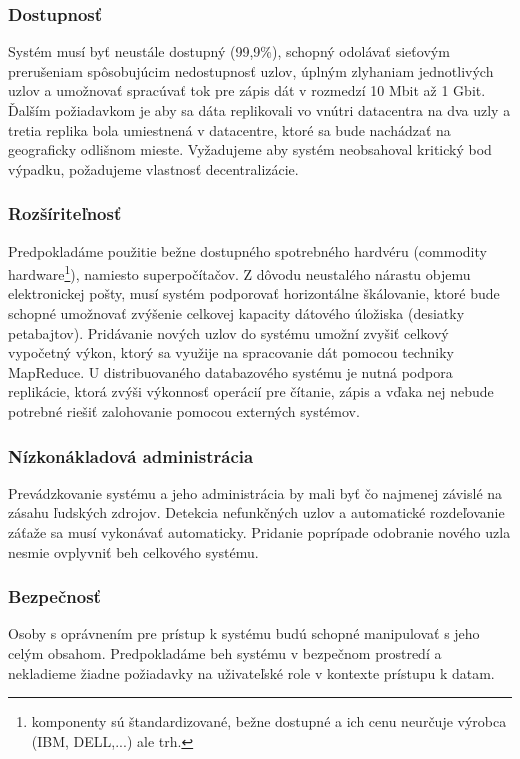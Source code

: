 \documentclass[11pt,twoside,a4paper]{book}
\begin{document}
\subsubsection*{Dostupnosť}
Systém musí byť neustále dostupný (99,9\%), schopný odolávať sieťovým prerušeniam spôsobujúcim nedostupnosť uzlov, úplným zlyhaniam jednotlivých uzlov a umožnovať spracúvať tok pre zápis dát v rozmedzí 10 Mbit až 1 Gbit. Ďalším požiadavkom je aby sa dáta replikovali vo vnútri datacentra na dva uzly a tretia replika bola umiestnená v datacentre, ktoré sa bude nachádzať na geograficky odlišnom mieste. Vyžadujeme aby systém neobsahoval kritický bod výpadku, požadujeme vlastnosť decentralizácie.

\subsubsection*{Rozšíriteľnosť}
Predpokladáme použitie bežne dostupného spotrebného hardvéru (commodity hardware\footnote{komponenty sú štandardizované, bežne dostupné a ich cenu neurčuje výrobca (IBM, DELL,...) ale trh.}), namiesto superpočítačov. Z dôvodu neustalého nárastu objemu elektronickej pošty, musí systém podporovať horizontálne škálovanie, ktoré bude schopné umožnovať zvýšenie celkovej kapacity dátového úložiska (desiatky petabajtov). Pridávanie nových uzlov do systému umožní zvyšiť celkový vypočetný výkon, ktorý sa využije na spracovanie dát pomocou techniky MapReduce. U distribuovaného databazového systému je nutná podpora replikácie, ktorá zvýši výkonnosť operácií pre čítanie, zápis a vďaka nej nebude potrebné riešiť zalohovanie pomocou externých systémov.

\subsubsection*{Nízkonákladová administrácia}
Prevádzkovanie systému a jeho administrácia by mali byť čo najmenej závislé na zásahu ľudských zdrojov. Detekcia nefunkčných uzlov a automatické rozdeľovanie záťaže sa musí vykonávať automaticky. Pridanie poprípade odobranie nového uzla nesmie ovplyvniť beh celkového systému.

\subsubsection*{Bezpečnosť}
Osoby s oprávnením pre prístup k systému budú schopné manipulovať s jeho celým obsahom. Predpokladáme beh systému v bezpečnom prostredí a nekladieme žiadne požiadavky na uživateľské role v kontexte prístupu k datam.
\end{document}
